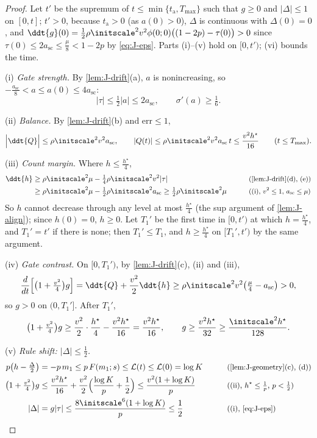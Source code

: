 \begin{proof}
Let $t'$ be the supremum of $t\le\min\{t_{\mathrm a},T_{\max}\}$ such that $g\ge0$ and $|\Delta|\le1$ on $[0,t]$; $t'>0$, because $t_{\mathrm a}>0$ (as $a(0)>0$), $\Delta$ is continuous with $\Delta(0)=0$, and
$\ddt{g}(0)=\frac{1}{2}\rho\initscale^2v^2\phi(0;0)\bigl((1-2p)-\tau(0)\bigr)>0$ since $\tau(0)\le2a_{\mathrm{sc}}\le\frac{\mu}{8}<1-2p$ by \cref{eq:J-eps}. Parts (i)--(v) hold on $[0,t')$; (vi) bounds the time.

\smallskip\noindent(i) \emph{Gate strength.} By \cref{lem:J-drift}(a), $a$ is nonincreasing, so $-\frac{a_{\mathrm{sc}}}{8}<a\le a(0)\le4a_{\mathrm{sc}}$:
\[
 |\tau|\le\tfrac{1}{2}|a|\le2a_{\mathrm{sc}},\qquad \sigma'(a)\ge\tfrac{1}{6}.
\]

\noindent(ii) \emph{Balance.} By \cref{lem:J-drift}(b) and $\mathrm{err}\le1$,
\[
 \Bigl|\ddt{Q}\Bigr|\le\rho\initscale^2v^2a_{\mathrm{sc}},\qquad |Q(t)|\le\rho\initscale^2v^2a_{\mathrm{sc}}\,t\le\frac{v^2h^\star}{16}\qquad(t\le T_{\max}).
\]

\noindent(iii) \emph{Count margin.} Where $h\le\frac{h^\star}{4}$,
\begin{alignat*}{2}
 \ddt{h}&\ge\rho\initscale^2\mu-\tfrac{1}{4}\rho\initscale^2v^2|\tau| &\qquad& \why{\cref{lem:J-drift}(d), (e)}\\
 &\ge\rho\initscale^2\mu-\tfrac{1}{2}\rho\initscale^2a_{\mathrm{sc}}\ge\tfrac{1}{2}\rho\initscale^2\mu && \why{(i), $v^2\le1$, $a_{\mathrm{sc}}\le\mu$}
\end{alignat*}
So $h$ cannot decrease through any level at most $\frac{h^\star}{4}$ (the sup argument of \cref{lem:J-align}); since $h(0)=0$, $h\ge0$.
Let $T_1'$ be the first time in $[0,t')$ at which $h=\frac{h^\star}{4}$, and $T_1'=t'$ if there is none; then $T_1'\le T_1$, and $h\ge\frac{h^\star}{4}$ on
$[T_1',t')$ by the same argument.

\noindent(iv) \emph{Gate contrast.} On $[0,T_1')$, by \cref{lem:J-drift}(c), (ii) and (iii),
\[
 \frac{d}{dt}\Bigl[\bigl(1+\tfrac{v^2}{4}\bigr)g\Bigr]=\ddt{Q}+\frac{v^2}{2}\ddt{h}\ge\rho\initscale^2v^2\bigl(\tfrac{\mu}{4}-a_{\mathrm{sc}}\bigr)>0,
\]
so $g>0$ on $(0,T_1']$. After $T_1'$,
\[
 \bigl(1+\tfrac{v^2}{4}\bigr)g\ge\frac{v^2}{2}\cdot\frac{h^\star}{4}-\frac{v^2h^\star}{16}=\frac{v^2h^\star}{16},\qquad g\ge\frac{v^2h^\star}{32}\ge\frac{\initscale^2h^\star}{128} .
\]

\noindent(v) \emph{Rule shift: $|\Delta|\le\frac{1}{2}$.}
\begin{alignat*}{2}
 p\bigl(h-\tfrac{\Delta}{2}\bigr)&=-p\,m_1\le p\,F(m_1;s)\le\mathcal L(t)\le\mathcal L(0)=\log K &\qquad& \why{\cref{lem:J-geometry}(c), (d)}\\
 \bigl(1+\tfrac{v^2}{4}\bigr)g&\le\frac{v^2h^\star}{16}+\frac{v^2}{2}\Bigl(\frac{\log K}{p}+\frac{1}{2}\Bigr)\le\frac{v^2(1+\log K)}{p} && \why{(ii), $h^\star\le\tfrac{1}{p}$, $p<\tfrac{1}{2}$}\\
 |\Delta|&=g|\tau|\le\frac{8\initscale^6(1+\log K)}{p}\le\frac{1}{2} && \why{(i), \cref{eq:J-eps}}
\end{alignat*}


\end{proof}
